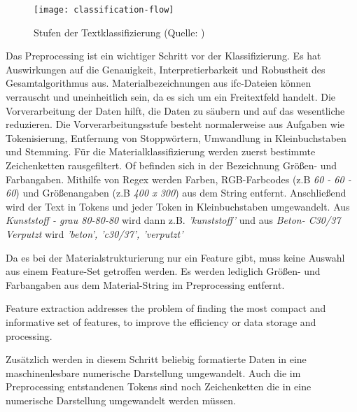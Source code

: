 \begin{figure}[H]
	\centering
	\texttt{[image: classification-flow]}
	\caption[Textklassifizierung]{Stufen der Textklassifizierung (Quelle:  \cite{Foram_2016})}
	\label{fig:classification flow}
\end{figure}

 Das Preprocessing ist ein wichtiger Schritt vor der Klassifizierung. Es hat Auswirkungen auf die Genauigkeit, Interpretierbarkeit und Robustheit des Gesamtalgorithmus aus. \citep{Zelaya_2019} Materialbezeichnungen aus \ac{ifc}-Dateien können verrauscht und uneinheitlich sein, da es sich um ein Freitextfeld handelt. Die Vorverarbeitung der Daten hilft, die Daten zu säubern und auf das wesentliche reduzieren. \citep{Priyanga_2016}
 Die Vorverarbeitungsstufe besteht normalerweise aus Aufgaben wie Tokenisierung, Entfernung von Stoppwörtern, Umwandlung in Kleinbuchstaben und Stemming. \citep{Uysal_2014}
Für die Materialklassifizierung werden zuerst bestimmte Zeichenketten rausgefiltert. Of befinden sich in der Bezeichnung Größen- und Farbangaben.
Mithilfe von Regex werden Farben, RGB-Farbcodes (z.B \textit{60 - 60 - 60}) und Größenangaben (z.B \textit{400 x 300}) aus dem String entfernt. Anschließend wird der Text in Tokens und jeder Token in Kleinbuchstaben umgewandelt. Aus \textit{\glqq Kunststoff - grau 80-80-80\grqq{}} wird dann z.B. \textit{\glqq 'kunststoff'\grqq{}} und aus \textit{\glqq Beton- C30/37 Verputzt\grqq{}} wird \textit{\glqq 'beton', 'c30/37', 'verputzt'\grqq{}}

Da es bei der Materialstrukturierung nur ein Feature gibt, muss keine Auswahl aus einem Feature-Set getroffen werden. Es werden lediglich Größen- und Farbangaben aus dem Material-String im Preprocessing entfernt.

\begin{definition}
	\label{d:feature-extraction}
	\glqq Feature extraction addresses the problem of finding the most compact and informative set of features, to improve the efficiency or data storage and processing.\grqq{} \citep{Guyon2006}
\end{definition}
Zusätzlich werden in diesem Schritt beliebig formatierte Daten in eine  maschinenlesbare numerische Darstellung umgewandelt. \citep{scit-learn_featureextraction} Auch die im Preprocessing entstandenen Tokens sind noch Zeichenketten die in eine numerische Darstellung umgewandelt werden müssen.

